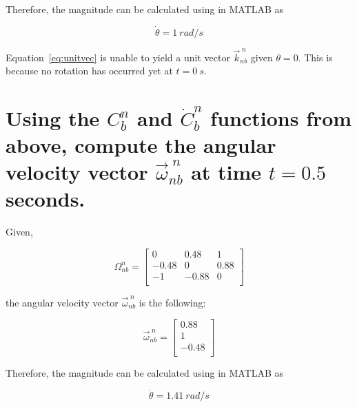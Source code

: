 \begin{parts}
\begin{subparts}
        Therefore, the magnitude can be calculated using  in MATLAB as

        \[\dot{\theta} = 1~\unit{rad/s}\]


        \solution
        Equation~\ref{eq:unitvec} is unable to yield a unit vector $\vec{k}^{\;n}_{nb}$ given $\theta =0$. This is because no rotation has occurred yet at $t = 0~\unit{s}$.
    \end{subparts}

    \part{Using the $C^n_b$ and $\dot{C}^n_b$ functions from above, compute the angular velocity vector $\vec{\omega}^{\;n}_{nb}$ at time $t = 0.5$ seconds.}

    \begin{subparts}

        \solution
        Given,

        \[\Omega^{n}_{nb} =
            \begin{bmatrix}
                0     & 0.48  & 1    \\
                -0.48 & 0     & 0.88 \\
                -1    & -0.88 & 0    \\
            \end{bmatrix}\]

        the angular velocity vector $\vec{\omega}^{\;n}_{nb}$ is the following:

        \[\vec{\omega}^{\;n}_{nb}=
            \begin{bmatrix}
                0.88  \\
                1     \\
                -0.48 \\
            \end{bmatrix}\]

        Therefore, the magnitude can be calculated using  in MATLAB as

        \[\dot{\theta} = 1.41~\unit{rad/s}\]



\end{subparts}
\end{parts}
